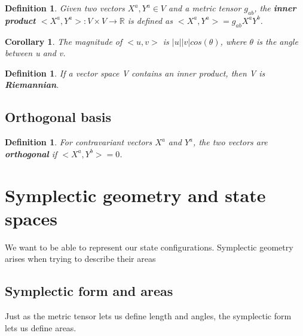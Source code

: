 \documentclass{book}
\newtheorem{defn}[equation]{Definition}
\newtheorem{coro}[equation]{Corollary}
\begin{document}
\begin{defn}
	Given two vectors $X^a,Y^a \in V$ and a metric tensor $g_{ab}$, the \textbf{inner product} $<X^a,Y^a> : V \times V \to \mathbb{R}$ is defined as $<X^a,Y^a> = g_{ab}X^aY^b$. 
\end{defn}

\begin{coro}
	The magnitude of $<u,v>$ is $|u||v|cos(\theta)$, where $\theta$ is the angle between u and v. 
\end{coro}

\begin{defn}
	If a vector space V contains an inner product, then V is \textbf{Riemannian}.
	\end{defn}



\subsection{Orthogonal basis}

\begin{defn}
	For contravariant vectors $X^a$ and $Y^a$, the two vectors are \textbf{orthogonal} if $<X^a,Y^b> = 0$. 
\end{defn}

\section{Symplectic geometry and state spaces}
We want to be able to represent our state configurations. Symplectic geometry arises when trying to describe their areas

\subsection{Symplectic form and areas}
Just as the metric tensor lets us define length and angles, the symplectic form lets us define areas.
\end{document}
